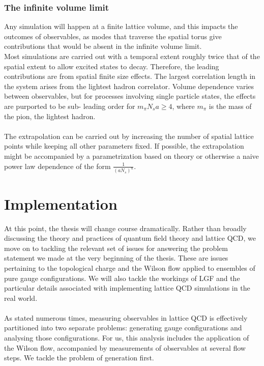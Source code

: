 \documentclass[a4paper,10pt]{article}
\begin{document}
\subsubsection{The infinite volume limit}
Any simulation will happen at a finite lattice volume, and this impacts the outcomes of observables, as modes that traverse the spatial torus give contributions that would be absent in the infinite volume limit.\\Most simulations are carried out with a temporal extent roughly twice that of the spatial extent to allow excited states to decay. Therefore, the leading contributions are from spatial finite size effects. The largest correlation length in the system arises from the lightest hadron correlator. Volume dependence varies between observables, but for processes involving single particle states, the effects are purported to be sub- leading order for $m_\pi N_sa \geq 4$, where $m_\pi$ is the mass of the pion, the lightest hadron.\\\\The extrapolation can be carried out by increasing the number of spatial lattice points while keeping all other parameters fixed. If possible, the extrapolation might be accompanied by a parametrization based on theory or otherwise a naive power law dependence of the form $\frac{1}{(aN_s)^n}$.

\section{Implementation}
At this point, the thesis will change course dramatically. Rather than broadly discussing the theory and practices of quantum field theory and lattice QCD, we move on to tackling the relevant set of issues for answering the problem statement we made at the very beginning of the thesis. These are issues pertaining to the topological charge and the Wilson flow applied to ensembles of pure gauge configurations. We will also tackle the workings of LGF and the particular details associated with implementing lattice QCD simulations in the real world.\\\\As stated numerous times, measuring observables in lattice QCD is effectively partitioned into two separate problems: generating gauge configurations and analysing those configurations. For us, this analysis includes the application of the Wilson flow, accompanied by measurements of observables at several flow steps. We tackle the problem of generation first.
\end{document}
